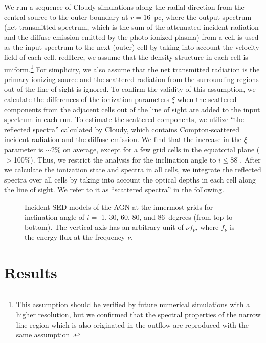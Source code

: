 \documentclass[twocolumn,times,twocolappendix]{aastex63}
\begin{document}
We run a sequence of \textsf{Cloudy} simulations along
the radial direction from the central source to the outer boundary at $r=16$~pc,
where the output spectrum
(net transmitted spectrum, which is the sum of the attenuated incident radiation and the diffuse emission emitted by the photo-ionized plasma)
from a cell is used as the input spectrum to the next (outer) cell by
taking into account the velocity field of each cell.
redHere, we assume that the density structure in each cell is uniform.\footnote{This assumption should be 
verified by future numerical simulations with a higher resolution,
but we confirmed that the spectral properties of the narrow line region 
which is also originated in the outflow are reproduced with the same assumption \citep[see][]{Wada2018b}.} 
For simplicity, we also assume that the net transmitted radiation
is the primary 
ionizing source and 
the scattered radiation from the surrounding regions out of the line of sight
is ignored.
To confirm the validity of this assumption, we calculate the
differences of the ionization parameters $\xi$ when the
scattered components
from the adjacent cells out of the line of sight
are added to the input spectrum in each run.
To estimate the scattered components, we utilize
``the reflected spectra'' calculated by \textsf{Cloudy}, which
contains Compton-scattered incident radiation and the diffuse emission.
We find that 
the increase in the $\xi$ parameter is $\sim$2\% on average, 
except for a few grid cells in
the equatorial plane ($>$100\%). 
Thus, we restrict the analysis for the inclination angle to $i \leq 88^\circ$. 
After we calculate the ionization state and spectra in all cells, we
integrate the reflected spectra
over all cells by taking into
account the optical depths in each cell
along the line of sight. We refer to it as ``scattered spectra'' in
the following.



\begin{figure}
\caption{
  Incident SED models of the AGN at the innermost grids for
  inclination angle of $i=$ 1, 30, 60, 80, and 86~degrees (from top to
  bottom).
The vertical axis has an arbitrary unit of $\nu f_\nu$, where $f_\nu$ is the energy flux at the frequency $\nu$.
}
\label{fig-insed}
\end{figure}

\section{Results}
\label{sec3}
\end{document}
